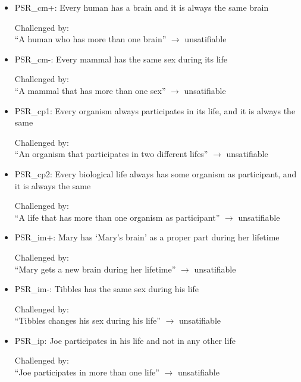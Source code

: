 \begin{itemize}

\item PSR\_cm+: Every human has a brain and it is always the same brain

Challenged by: \\``A human who has more than one brain''  $\rightarrow$ unsatifiable



\item PSR\_cm-: Every mammal has the same sex during its life

Challenged by: \\``A mammal that has more than one sex''  $\rightarrow$ unsatifiable

 
\item PSR\_cp1: Every organism always participates in its life, and it is always the same

Challenged by: \\``An  organism that participates in two different lifes''  $\rightarrow$ unsatifiable


\item PSR\_cp2: Every biological life always has some organism as participant, and it is always the same

Challenged by: \\``A life that has more than one organism as participant''  $\rightarrow$ unsatifiable


\item PSR\_im+: Mary has `Mary's brain' as a proper part during her lifetime 

Challenged by: \\``Mary gets a new brain during her lifetime''  $\rightarrow$ unsatifiable


\item PSR\_im-: Tibbles has the same sex during his life 

Challenged by: \\``Tibbles changes his sex during his life''  $\rightarrow$ unsatifiable


\item PSR\_ip: Joe participates in his life and not in any other life

Challenged by: \\``Joe participates in more than one life''  $\rightarrow$ unsatifiable



\end{itemize}
